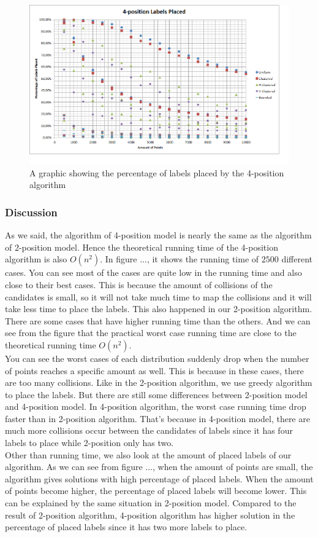 \documentclass[crop=false,a4paper,oneside,11pt]{standalone}
\begin{document}
 \begin{figure}[h!]
 \centering
  \centerline{\includegraphics[scale = 0.6]{4PosLabelsPlaced.png}}
  \caption{A graphic showing the percentage of labels placed by the 4-position algorithm}
 \end{figure}
\subsubsection{Discussion}
As we said, the algorithm of 4-position model is nearly the same as the algorithm of 2-position model. Hence the theoretical running time of the 4-position algorithm is also $O(n^2)$. In figure ..., it shows the running time of $2500$ different cases. You can see most of the cases are quite low in the running time and also close to their best cases. This is because the amount of collisions of the candidates is small, so it will not take much time to map the collisions and it will take less time to place the labels. This also happened in our 2-position algorithm. There are some cases that have higher running time than the others. And we can see from the figure that the practical worst case running time are close to the theoretical running time $O(n^2)$. \\
You can see the worst cases of each distribution suddenly drop when the number of points reaches a specific amount as well. This is because in these cases, there are too many collisions. Like in the 2-position algorithm, we use greedy algorithm to place the labels. But there are still some differences between 2-position model and 4-position model. In 4-position algorithm, the worst case running time drop faster than in 2-position algorithm. That's because in 4-position model, there are much more collisions occur between the candidates of labels since it has four labels to place while 2-position only has two.\\
Other than running time, we also look at the amount of placed labels of our algorithm. As we can see from figure ..., when the amount of points are small, the algorithm gives solutions with high percentage of placed labels. When the amount of points become higher, the percentage of placed labels will become lower. This can be explained by the same situation in 2-position model. Compared to the result of 2-position algorithm, 4-position algorithm has higher solution in the percentage of placed labels since it has two more labels to place.\\
\end{document}
